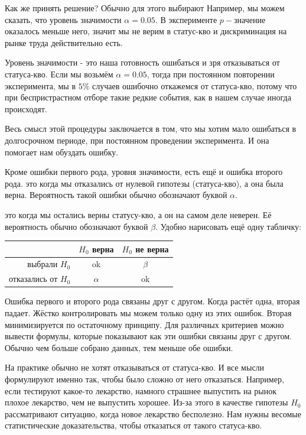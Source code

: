 \documentclass[12pt, a4paper, oneside]{article}
\begin{document}
Как же принять решение? Обычно для этого выбирают  Например, мы можем сказать, что уровень значимости $\alpha = 0.05.$ В эксперименте $p-$значение оказалось меньше него, значит мы не верим в статус-кво и дискриминация на рынке труда действительно есть. 

Уровень значимости - это наша готовность ошибаться и зря отказываться от статуса-кво. Если мы возьмём $\alpha = 0.05$, тогда при постоянном повторении эксперимента, мы в $5\%$ случаев ошибочно откажемся от статуса-кво, потому что при беспристрастном отборе такие редкие события, как в нашем случае иногда происходят. 

Весь смысл этой процедуры заключается в том, что мы хотим мало ошибаться в долгосрочном периоде, при постоянном проведении эксперимента. И она помогает нам обуздать ошибку. 

Кроме ошибки первого рода, уровня значимости, есть ещё и ошибка второго рода.  это когда мы отказались от нулевой гипотезы (статуса-кво), а она была верна. Вероятность такой ошибки обычно обозначают буквой $\alpha$.

 это когда мы остались верны статусу-кво, а он на самом деле неверен. Её вероятность обычно обозначают буквой $\beta$. Удобно нарисовать ещё одну табличку: 

\begin{center}
	\begin{tabular}{|r|c|c|}
	\hline
	                    & $H_0$ верна & $H_0$ не верна \\  \hline 
	выбрали $H_0$       &  ok &    $\beta$ \\      \hline 
	отказались от $H_0$ &   $\alpha$ &  ok \\      \hline 
	\end{tabular}
\end{center}

Ошибка первого и второго рода связаны друг с другом. Когда растёт одна, вторая падает. Жёстко контролировать мы можем только одну из этих ошибок. Вторая минимизируется по остаточному принципу. Для различных критериев можно вывести формулы, которые показывают как эти ошибки связаны друг с другом. Обычно чем больше собрано данных, тем меньше обе ошибки.

На практике обычно не хотят отказываться от статуса-кво. И все мысли формулируют именно так, чтобы было сложно от него отказаться. Например, если тестируют какое-то лекарство, намного страшнее выпустить на рынок плохое лекарство, чем не выпустить хорошее. Из-за этого в качестве гипотезы $H_0$ рассматривают ситуацию, когда новое лекарство бесполезно. Нам нужны весомые статистические доказательства, чтобы отказаться от такого статуса-кво. 
\end{document}
